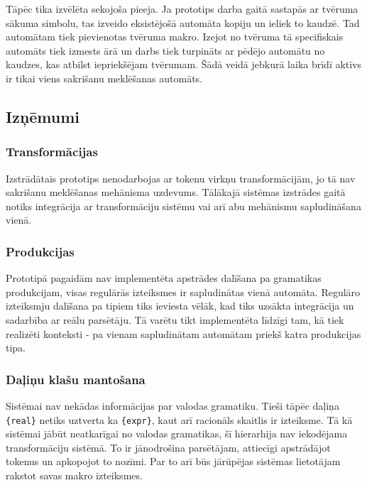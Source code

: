 Tāpēc tika izvēlēta sekojoša pieeja. Ja prototips darba gaitā sastapās ar tvēruma sākuma simbolu, tas izveido eksistējošā automāta kopiju un ieliek to kaudzē. Tad automātam tiek pievienotas tvēruma makro. Izejot no tvēruma tā specifiskais automāts tiek izmests ārā un darbs tiek turpināts ar pēdējo automātu no kaudzes, kas atbilst iepriekšējam tvērumam. Šādā veidā jebkurā laika brīdī aktīvs ir tikai viens sakrišanu meklēšanas automāts.

\subsection{\label{sbs:prot_problems}Izņēmumi}

\subsubsection{Transformācijas}

Izstrādātais prototips nenodarbojas ar tokenu virkņu transformācijām, jo tā nav sakrišanu meklēšanas mehānisma uzdevums. Tālākajā sistēmas izstrādes gaitā notiks integrācija ar transformāciju sistēmu vai arī abu mehānismu sapludināšana vienā.

\subsubsection{Produkcijas}

Prototipā pagaidām nav implementēta apstrādes dalīšana pa gramatikas produkcijam, visas regulārās izteiksmes ir sapludinātas vienā automāta. Regulāro izteiksmju dalīšana pa tipiem tiks ieviesta vēlāk, kad tiks uzsākta integrācija un sadarbība ar reālu parsētāju. Tā varētu tikt implementēta līdzīgi tam, kā tiek realizēti konteksti - pa vienam sapludinātam automātam priekš katra produkcijas tipa.

\subsubsection{Daļiņu klašu mantošana}

Sistēmai nav nekādas informācijas par valodas gramatiku. Tieši tāpēc daļiņa \verb|{real}| netiks uztverta ka \verb|{expr}|, kaut arī racionāls skaitlis ir izteiksme. Tā kā sistēmai jābūt neatkarīgai no valodas gramatikas, šī hierarhija nav iekodējama transformāciju sistēmā. To ir jānodrošina parsētājam, attiecīgi apstrādājot tokenus un apkopojot to nozīmi. Par to arī būs jārūpējas sistēmas lietotājam rakstot savas makro izteiksmes.

